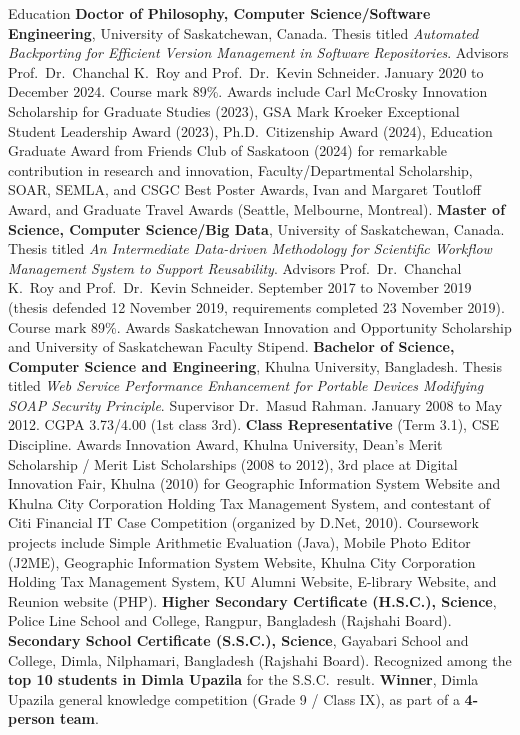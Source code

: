 \begin{rubric}{Education}
\entry*[2020/24]%
	\textbf{Doctor of Philosophy, Computer Science/Software Engineering}, University of Saskatchewan, Canada.
	Thesis titled \emph{Automated Backporting for Efficient Version Management in Software Repositories}.
	Advisors Prof.\ Dr.\ Chanchal K.\ Roy and Prof.\ Dr.\ Kevin Schneider.
	January 2020 to December 2024. Course mark 89\%.
	Awards include Carl McCrosky Innovation Scholarship for Graduate Studies (2023), GSA Mark Kroeker Exceptional Student Leadership Award (2023), Ph.D.\ Citizenship Award (2024), Education Graduate Award from Friends Club of Saskatoon (2024) for remarkable contribution in research and innovation, Faculty/Departmental Scholarship, SOAR, SEMLA, and CSGC Best Poster Awards, Ivan and Margaret Toutloff Award, and Graduate Travel Awards (Seattle, Melbourne, Montreal).
\vspace{-1mm}
\entry*[2017/19]%
	\textbf{Master of Science, Computer Science/Big Data}, University of Saskatchewan, Canada.
	Thesis titled \emph{An Intermediate Data-driven Methodology for Scientific Workflow Management System to Support Reusability}.
	Advisors Prof.\ Dr.\ Chanchal K.\ Roy and Prof.\ Dr.\ Kevin Schneider.
	September 2017 to November 2019 (thesis defended 12 November 2019, requirements completed 23 November 2019). Course mark 89\%.
	Awards Saskatchewan Innovation and Opportunity Scholarship and University of Saskatchewan Faculty Stipend.
\vspace{-1mm}
\entry*[2008/12]%
	\textbf{Bachelor of Science, Computer Science and Engineering}, Khulna University, Bangladesh.
	Thesis titled \emph{Web Service Performance Enhancement for Portable Devices Modifying SOAP Security Principle}.
	Supervisor Dr.\ Masud Rahman.
	January 2008 to May 2012. CGPA 3.73/4.00 (1st class 3rd).
	\textbf{Class Representative} (Term 3.1), CSE Discipline.
	Awards Innovation Award, Khulna University, Dean's Merit Scholarship / Merit List Scholarships (2008 to 2012), 3rd place at Digital Innovation Fair, Khulna (2010) for Geographic Information System Website and Khulna City Corporation Holding Tax Management System, and contestant of Citi Financial IT Case Competition (organized by D.Net, 2010).
	Coursework projects include Simple Arithmetic Evaluation (Java), Mobile Photo Editor (J2ME), Geographic Information System Website, Khulna City Corporation Holding Tax Management System, KU Alumni Website, E-library Website, and Reunion website (PHP).
\vspace{-1mm}
\entry*[2006]%
	\textbf{Higher Secondary Certificate (H.S.C.), Science}, Police Line School and College, Rangpur, Bangladesh (Rajshahi Board).
\vspace{-1mm}
\entry*[2004]%
	\textbf{Secondary School Certificate (S.S.C.), Science}, Gayabari School and College, Dimla, Nilphamari, Bangladesh (Rajshahi Board).
	Recognized among the \textbf{top 10 students in Dimla Upazila} for the S.S.C.\ result.
	\textbf{Winner}, Dimla Upazila general knowledge competition (Grade 9 / Class IX), as part of a \textbf{4-person team}.
\end{rubric}
